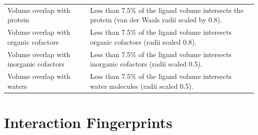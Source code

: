 \begin{longtable}[]{@{}
  >{\raggedright\arraybackslash}p{}
  >{\raggedright\arraybackslash}p{}@{}}
Volume overlap with protein & Less than 7.5\% of the ligand volume intersects the protein (van der Waals radii scaled by 0.8). \\
Volume overlap with organic cofactors & Less than 7.5\% of the ligand volume intersects organic cofactors (radii scaled 0.8). \\
Volume overlap with inorganic cofactors & Less than 7.5\% of the ligand volume intersects inorganic cofactors (radii scaled 0.5). \\
Volume overlap with waters & Less than 7.5\% of the ligand volume intersects water molecules (radii scaled 0.5). \\
\end{longtable}

\hypertarget{interaction-fingerprints}{%
\section{Interaction Fingerprints}\label{interaction-fingerprints}}

